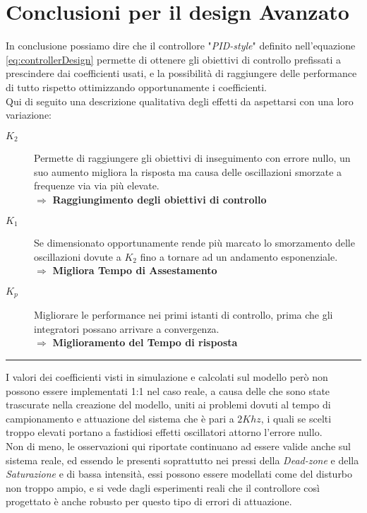 \section{Conclusioni per il design Avanzato} \label{sec:designControlloreConclusioni}
In conclusione possiamo dire che il controllore "\textit{PID-style}" definito nell'equazione \ref{eq:controllerDesign} permette di ottenere gli obiettivi di controllo prefissati a prescindere dai coefficienti usati, e la possibilità di raggiungere delle performance di tutto rispetto ottimizzando opportunamente i coefficienti.\\
Qui di seguito una descrizione qualitativa degli effetti da aspettarsi con una loro variazione:
\begin{description}
	\item[{\boldmath$ K_2 $}] Permette di raggiungere gli obiettivi di inseguimento con errore nullo, un suo aumento migliora la risposta ma causa delle oscillazioni smorzate a frequenze via via più elevate. \\
	      $\Rightarrow$ \textbf{Raggiungimento degli obiettivi di controllo}
	\item[{\boldmath$ K_1 $}] Se dimensionato opportunamente rende più marcato lo smorzamento delle oscillazioni dovute a $ K_2 $ fino a tornare ad un andamento esponenziale.\\
	      $\Rightarrow$ \textbf{Migliora Tempo di Assestamento}
	\item[{\boldmath$ K_p $}] Migliorare le performance nei primi istanti di controllo, prima che gli integratori possano arrivare a convergenza.\\
	      $\Rightarrow$ \textbf{Miglioramento del Tempo di risposta}
\end{description} \vspace{-8mm}
\noindent
\begin{center}
	\rule{0.75\linewidth}{0.5px}
\end{center}\vspace{-4mm}
\noindent
I valori dei coefficienti visti in simulazione e calcolati sul modello però non possono essere implementati 1:1 nel caso reale, a causa delle \nonLinearita che sono state trascurate nella creazione del modello, uniti ai problemi dovuti al tempo di campionamento e attuazione del sistema che è pari a $ 2Khz $, i quali se scelti troppo elevati portano a fastidiosi effetti oscillatori attorno l'errore nullo.\\
Non di meno, le osservazioni qui riportate continuano ad essere valide anche sul sistema reale, ed essendo le \nonLinearita presenti soprattutto nei pressi della \textit{Dead-zone} e della \textit{Saturazione} e di bassa intensità, essi possono essere modellati come del disturbo non troppo ampio, e si vede dagli esperimenti reali che il controllore così progettato è anche robusto per questo tipo di errori di attuazione.



